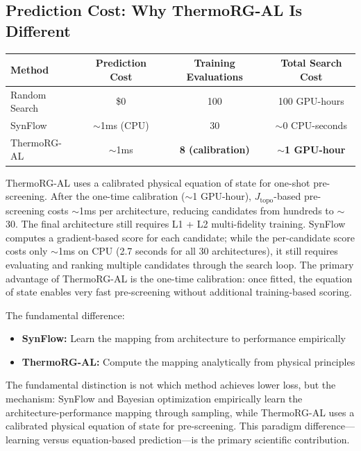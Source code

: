 \documentclass[11pt, a4paper]{article}
\theoremstyle{plain}
\begin{document}
\subsection{Prediction Cost: Why ThermoRG-AL Is Different}

\begin{center}
\begin{tabular}{lccc}
\toprule
Method & Prediction Cost & Training Evaluations & Total Search Cost \\
\midrule
Random Search & \$0 & 100 & 100 GPU-hours \\
SynFlow & $\sim$1ms (CPU) & 30 & $\sim$0 CPU-seconds \\
ThermoRG-AL & $\sim$1ms & \textbf{8 (calibration)} & \textbf{$\sim$1 GPU-hour} \\
\bottomrule
\end{tabular}
\end{center}

ThermoRG-AL uses a calibrated physical equation of state for one-shot pre-screening. After the one-time calibration ($\sim$1 GPU-hour), $J_{\mathrm{topo}}$-based pre-screening costs $\sim$1ms per architecture, reducing candidates from hundreds to $\sim$30. The final architecture still requires L1 + L2 multi-fidelity training. SynFlow computes a gradient-based score for each candidate; while the per-candidate score costs only $\sim$1ms on CPU (2.7 seconds for all 30 architectures), it still requires evaluating and ranking multiple candidates through the search loop. The primary advantage of ThermoRG-AL is the one-time calibration: once fitted, the equation of state enables very fast pre-screening without additional training-based scoring.

The fundamental difference:
\begin{itemize}
\item \textbf{SynFlow:} Learn the mapping from architecture to performance empirically
\item \textbf{ThermoRG-AL:} Compute the mapping analytically from physical principles
\end{itemize}

The fundamental distinction is not which method achieves lower loss, but the mechanism: SynFlow and Bayesian optimization empirically learn the architecture-performance mapping through sampling, while ThermoRG-AL uses a calibrated physical equation of state for pre-screening. This paradigm difference---learning versus equation-based prediction---is the primary scientific contribution.
\end{document}
